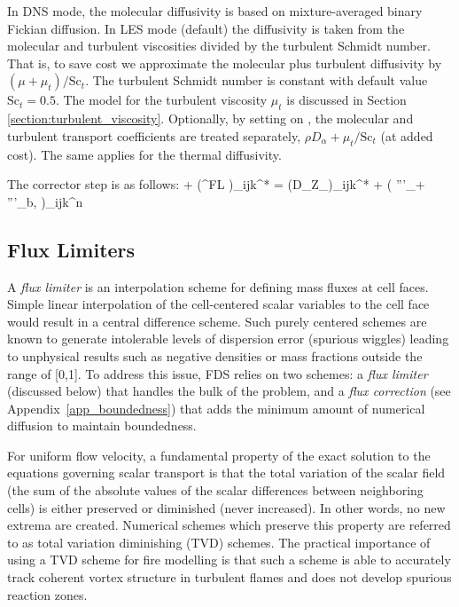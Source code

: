In DNS mode, the molecular diffusivity is based on mixture-averaged binary Fickian diffusion.  In LES mode (default) the diffusivity is taken from the molecular and turbulent viscosities divided by the turbulent Schmidt number.  That is, to save cost we approximate the molecular plus turbulent diffusivity by $(\mu + \mu_t)/\mbox{Sc}_t$.   The turbulent Schmidt number is constant with default value $\mbox{Sc}_t = 0.5$.  The model for the turbulent viscosity $\mu_t$ is discussed in Section \ref{section:turbulent_viscosity}.  Optionally, by setting  on , the molecular and turbulent transport coefficients are treated separately, $\rho D_\alpha + \mu_t/\mbox{Sc}_t$ (at added cost).  The same applies for the thermal diffusivity.

The corrector step is as follows:
\be {} {\ha \dt}
    + \nabla\!\cdot(^{\rm FL} )_{ijk}^*
    = \nabla\!\cdot (\rho D_\alpha \nabla Z_\alpha)_{ijk}^{*} + \left( '''_\alpha + '''_{\rm b,\alpha} \right)_{ijk}^n
\ee


\subsection{Flux Limiters}
\label{sec_flux_limiters}

A \emph{flux limiter} is an interpolation scheme for defining mass fluxes at cell faces. Simple linear interpolation of the cell-centered scalar variables to the cell face would result in a central difference scheme.  Such purely centered schemes are known to generate intolerable levels of dispersion error (spurious wiggles) leading to unphysical results such as negative densities or mass fractions outside the range of [0,1].  To address this issue, FDS relies on two schemes: a \emph{flux limiter} (discussed below) that handles the bulk of the problem, and a \emph{flux correction} (see Appendix~\ref{app_boundedness}) that adds the minimum amount of numerical diffusion to maintain boundedness.

For uniform flow velocity, a fundamental property of the exact solution to the equations governing scalar transport is that the total variation of the scalar field (the sum of the absolute values of the scalar differences between neighboring cells) is either preserved or diminished (never increased).  In other words, no new extrema are created.  Numerical schemes which preserve this property are referred to as total variation diminishing (TVD) schemes.  The practical importance of using a TVD scheme for fire modelling is that such a scheme is able to accurately track coherent vortex structure in turbulent flames and does not develop spurious reaction zones.

